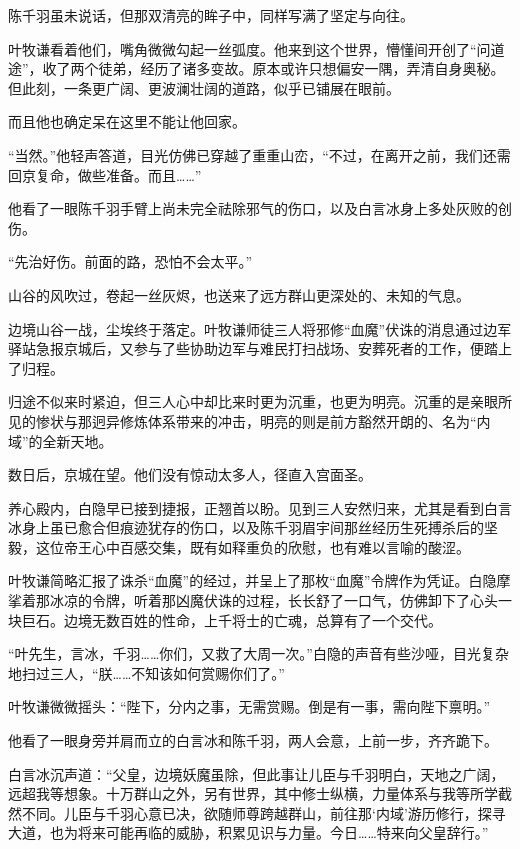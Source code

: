 陈千羽虽未说话，但那双清亮的眸子中，同样写满了坚定与向往。

叶牧谦看着他们，嘴角微微勾起一丝弧度。他来到这个世界，懵懂间开创了“问道途”，收了两个徒弟，经历了诸多变故。原本或许只想偏安一隅，弄清自身奥秘。但此刻，一条更广阔、更波澜壮阔的道路，似乎已铺展在眼前。

而且他也确定呆在这里不能让他回家。

“当然。”他轻声答道，目光仿佛已穿越了重重山峦，“不过，在离开之前，我们还需回京复命，做些准备。而且……”

他看了一眼陈千羽手臂上尚未完全祛除邪气的伤口，以及白言冰身上多处灰败的创伤。

“先治好伤。前面的路，恐怕不会太平。”

山谷的风吹过，卷起一丝灰烬，也送来了远方群山更深处的、未知的气息。

\vspace{2em}

边境山谷一战，尘埃终于落定。叶牧谦师徒三人将邪修“血魔”伏诛的消息通过边军驿站急报京城后，又参与了些协助边军与难民打扫战场、安葬死者的工作，便踏上了归程。

归途不似来时紧迫，但三人心中却比来时更为沉重，也更为明亮。沉重的是亲眼所见的惨状与那迥异修炼体系带来的冲击，明亮的则是前方豁然开朗的、名为“内域”的全新天地。

数日后，京城在望。他们没有惊动太多人，径直入宫面圣。

养心殿内，白隐早已接到捷报，正翘首以盼。见到三人安然归来，尤其是看到白言冰身上虽已愈合但痕迹犹存的伤口，以及陈千羽眉宇间那丝经历生死搏杀后的坚毅，这位帝王心中百感交集，既有如释重负的欣慰，也有难以言喻的酸涩。

叶牧谦简略汇报了诛杀“血魔”的经过，并呈上了那枚“血魔”令牌作为凭证。白隐摩挲着那冰凉的令牌，听着那凶魔伏诛的过程，长长舒了一口气，仿佛卸下了心头一块巨石。边境无数百姓的性命，上千将士的亡魂，总算有了一个交代。

“叶先生，言冰，千羽……你们，又救了大周一次。”白隐的声音有些沙哑，目光复杂地扫过三人，“朕……不知该如何赏赐你们了。”

叶牧谦微微摇头：“陛下，分内之事，无需赏赐。倒是有一事，需向陛下禀明。”

他看了一眼身旁并肩而立的白言冰和陈千羽，两人会意，上前一步，齐齐跪下。

白言冰沉声道：“父皇，边境妖魔虽除，但此事让儿臣与千羽明白，天地之广阔，远超我等想象。十万群山之外，另有世界，其中修士纵横，力量体系与我等所学截然不同。儿臣与千羽心意已决，欲随师尊跨越群山，前往那‘内域’游历修行，探寻大道，也为将来可能再临的威胁，积累见识与力量。今日……特来向父皇辞行。”

